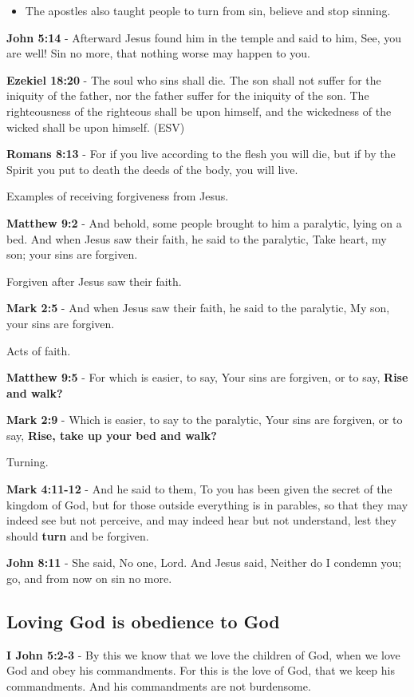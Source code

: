 \documentclass[11pt]{article}
\begin{document}
\begin{itemize}
\item The apostles also taught people to turn from sin, believe and stop sinning.
\end{itemize}

\textbf{John 5:14} - Afterward Jesus found him in the temple and said to him, See, you are well! Sin no more, that nothing worse may happen to you.

\textbf{Ezekiel 18:20} - The soul who sins shall die. The son shall not suffer for the iniquity of the father, nor the father suffer for the iniquity of the son. The righteousness of the righteous shall be upon himself, and the wickedness of the wicked shall be upon himself. (ESV)

\textbf{Romans 8:13} - For if you live according to the flesh you will die, but if by the Spirit you put to death the deeds of the body, you will live.

Examples of receiving forgiveness from Jesus.

\textbf{Matthew 9:2} - And behold, some people brought to him a paralytic, lying on a bed. And when Jesus saw their faith, he said to the paralytic, Take heart, my son; your sins are forgiven.

Forgiven after Jesus saw their faith.

\textbf{Mark 2:5} - And when Jesus saw their faith, he said to the paralytic, My son, your sins are forgiven.

Acts of faith.

\textbf{Matthew 9:5} - For which is easier, to say, Your sins are forgiven, or to say, \textbf{Rise and walk?}

\textbf{Mark 2:9} - Which is easier, to say to the paralytic, Your sins are forgiven, or to say, \textbf{Rise, take up your bed and walk?}

Turning.

\textbf{Mark 4:11-12} - And he said to them, To you has been given the secret of the kingdom of God, but for those outside everything is in parables, so that they may indeed see but not perceive, and may indeed hear but not understand, lest they should \textbf{turn} and be forgiven.

\textbf{John 8:11} - She said, No one, Lord. And Jesus said, Neither do I condemn you; go, and from now on sin no more.

\subsection{Loving God is obedience to God}
\label{sec:orgc3d6598}
\textbf{I John 5:2-3} - By this we know that we love the children of God, when we love God and obey his commandments. For this is the love of God, that we keep his commandments. And his commandments are not burdensome.
\end{document}
